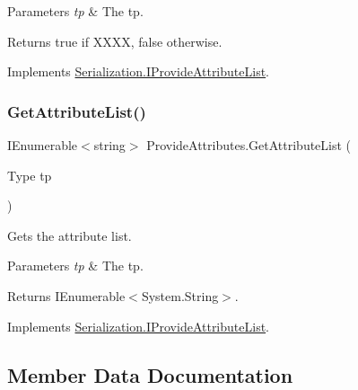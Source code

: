 \begin{DoxyParams}{Parameters}
{\em tp} & The tp.\\
\hline
\end{DoxyParams}
\begin{DoxyReturn}{Returns}
{\ttfamily true} if X\+X\+XX, {\ttfamily false} otherwise.
\end{DoxyReturn}


Implements \hyperlink{interface_serialization_1_1_i_provide_attribute_list_a67a8c176842f57fb928e68e87fdc4ade}{Serialization.\+I\+Provide\+Attribute\+List}.

\mbox{\label{class_provide_attributes_aa43c5b30e202787ad574923f414c7eb3}} 
\subsubsection{\texorpdfstring{Get\+Attribute\+List()}{GetAttributeList()}}
{\footnotesize\ttfamily I\+Enumerable$<$string$>$ Provide\+Attributes.\+Get\+Attribute\+List (\begin{DoxyParamCaption}\item[{Type}]{tp }\end{DoxyParamCaption})\hspace{0.3cm}{\ttfamily [inline]}}



Gets the attribute list. 


\begin{DoxyParams}{Parameters}
{\em tp} & The tp.\\
\hline
\end{DoxyParams}
\begin{DoxyReturn}{Returns}
I\+Enumerable$<$System.\+String$>$.
\end{DoxyReturn}


Implements \hyperlink{interface_serialization_1_1_i_provide_attribute_list_afd95d460c41d4fddfb45b9e342557d01}{Serialization.\+I\+Provide\+Attribute\+List}.



\subsection{Member Data Documentation}
\mbox{\label{class_provide_attributes_a64e5e27c26a7a969189543b2a6a6467b}} 
